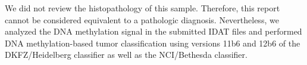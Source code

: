 We did not review the histopathology of this sample.
Therefore, this report cannot be considered equivalent to a pathologic diagnosis.
Nevertheless, we analyzed the DNA methylation signal in the submitted IDAT files
and performed DNA methylation-based tumor classification using versions 11b6 and
12b6 of the DKFZ/Heidelberg classifier as well as the NCI/Bethesda classifier.

